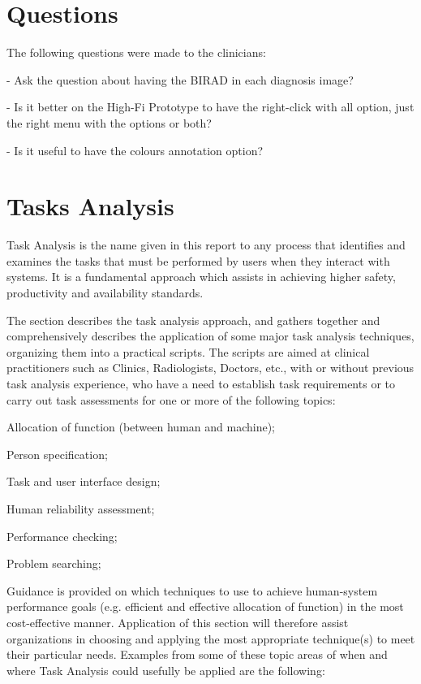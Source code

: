 \section{Questions}

The following questions were made to the clinicians:

- Ask the question about having the BIRAD in each diagnosis image?

- Is it better on the High-Fi Prototype to have the right-click with all option, just the right menu with the options or both?

- Is it useful to have the colours annotation option?

\section{Tasks Analysis}

Task Analysis is the name given in this report to any process that identifies and examines the tasks that must be performed by users when they interact with systems. It is a fundamental approach which assists in achieving higher safety, productivity and availability standards.

The section describes the task analysis approach, and gathers together and comprehensively describes the application of some major task analysis techniques, organizing them into a practical scripts. The scripts are aimed at clinical practitioners such as Clinics, Radiologists, Doctors, etc., with or without previous task analysis experience, who have a need to establish task requirements or to carry out task assessments for one or more of the following topics:

 Allocation of function (between human and machine);

 Person specification;

 Task and user interface design;

 Human reliability assessment;

 Performance checking;

 Problem searching;

\clearpage

Guidance is provided on which techniques to use to achieve human-system performance goals (e.g. efficient and effective allocation of function) in the most cost-effective manner. Application of this section will therefore assist organizations in choosing and applying the most appropriate technique(s) to meet their particular needs. Examples from some of these topic areas of when and where Task Analysis could usefully be applied are the following:

